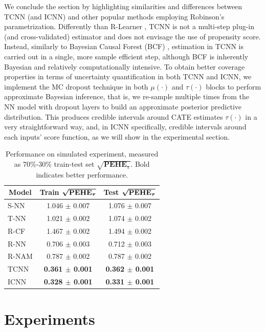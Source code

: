 \documentclass[nohyperref]{article}
\theoremstyle{plain}
\theoremstyle{definition}
\theoremstyle{remark}
\begin{document}
We conclude the section by highlighting similarities and differences between TCNN (and ICNN) and other popular methods employing Robinson's parametrization. Differently than R-Learner \citep{nie_2020}, TCNN is not a multi-step plug-in (and cross-validated) estimator and does not envisage the use of propensity score. Instead, similarly to Bayesian Causal Forest (BCF) \citep{hahn_2020, caron_2021}, estimation in TCNN is carried out in a single, more sample efficient step, although BCF is inherently Bayesian and relatively computationally intensive. To obtain better coverage properties in terms of uncertainty quantification in both TCNN and ICNN, we implement the MC dropout technique \citep{gal_2016} in both $\mu(\cdot)$ and $\tau(\cdot)$ blocks to perform approximate Bayesian inference, that is, we re-sample multiple times from the NN model with dropout layers to build an approximate posterior predictive distribution. This produces credible intervals around CATE estimates $\tau(\cdot)$ in a very straightforward way, and, in ICNN specifically, credible intervals around each inputs' score function, as we will show in the experimental section.


\begin{table}[t]
    \centering
    \begin{tabular}{l | c | c}
        \multicolumn{1}{c|}{\textbf{Model}} & \textbf{Train} $\bm{\sqrt{\text{\textbf{PEHE}}_\tau}}$ &  \textbf{Test} $\bm{\sqrt{\text{\textbf{PEHE}}_\tau}}$ \\
        \midrule
        S-NN  & 1.046 $\pm$ 0.007  & 1.076 $\pm$ 0.007 \\
        T-NN  &  1.021 $\pm$ 0.002 & 1.074 $\pm$ 0.002 \\
        \midrule
        R-CF  & 1.467 $\pm$ 0.002 & 1.494 $\pm$ 0.002 \\
        R-NN  & 0.706 $\pm$ 0.003 & 0.712 $\pm$ 0.003 \\
        R-NAM & 0.787 $\pm$ 0.002 & 0.787 $\pm$ 0.002 \\
        \midrule
        TCNN  & \textbf{0.361 $\pm$ 0.001} & \textbf{0.362 $\pm$ 0.001} \\
        ICNN  & \textbf{0.328 $\pm$ 0.001} &  \textbf{0.331 $\pm$ 0.001}
    \end{tabular}
    \caption{Performance on simulated experiment, measured as 70\%-30\% train-test set $\bm{\sqrt{\text{PEHE}_\tau}}$. Bold indicates better performance.}
    \label{tab:result}
\end{table}


\section{Experiments} \label{sec:exp}
\end{document}
